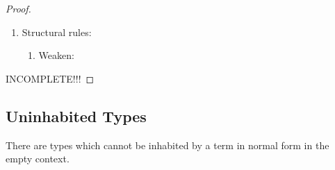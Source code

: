 \begin{theorem}
{\begin{proof}
\begin{enumerate}
\begin{enumerate}
\begin{enumerate}
\begin{enumerate}
                        \item $f a \reduce f b$ where $a \reduce b$:
                            From the second induction hypothesis we get that $b$
                            has the same type as $a$ and therefore $f b:
                            B[x:=b]$ is valid. ?????INCOMPLETE???

                        \item $(\lambda y^B. e) a \reduce e[y:=a]$:

                    \end{enumerate}

                    \item Right part: Immediate consequence of the induction
                        hypotheses.
                \end{enumerate}
            \end{enumerate}

            \item Structural rules:
            \begin{enumerate}
                \item Weaken:
            \end{enumerate}
        \end{enumerate}

        INCOMPLETE!!!
    \end{proof}
    }
\end{theorem}





\subsection{Uninhabited Types}



There are types which cannot be inhabited by a term in normal form in the empty
context.

